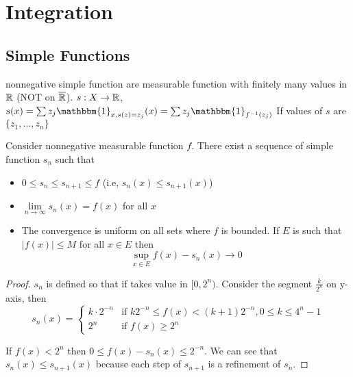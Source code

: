 
\chapter{Integration}
\section{Simple Functions}

\begin{definition}
  nonnegative simple function are measurable function with finitely many values in $\mathbb R$ (NOT on $\overline{\mathbb R}$).
  $s: X \to \mathbb R$, $s(x) = \sum z_j \mathbbm{1}_{x, s(z) = z_j}(x) = \sum z_j \mathbbm{1}_{f^{-1}({z_j})}$
  If values of $s$ are $\{z_1, \dotsc, z_n\}$
\end{definition}


\begin{theorem}
  Consider nonnegative measurable function $f$.
  There exist a sequence of simple function $s_n$ such that 
  \begin{itemize}
    \item $0 \le s_n \le s_{n+1} \le f$ (i.e, $s_n(x) \le s_{n+1}(x)$)
    \item $\lim\limits_{n\to\infty}s_n(x) = f(x)$ for all $x$
    \item The convergence is uniform on all sets where $f$ is bounded.
    If $E$ is such that $|f(x)| \le M$ for all $x \in E$ then
    \[\sup_{x \in E} f(x) - s_n(x) \to 0\]
  \end{itemize}
\end{theorem}

\begin{proof}
  $s_n$ is defined so that if takes value in $[0, 2^n)$. Consider the segment $\frac{k}{2^n}$ on y-axis,
  then $$s_n(x) = \begin{cases}
    k\cdot2^{-n} & \text{if } k2^{-n} \le f(x) < (k+1)2^{-n}, 0 \le k \le 4^n - 1 \\
    2^n & \text{if } f(x) \ge 2^n
  \end{cases}$$

If $f(x) < 2^n$ then $0 \le f(x) - s_n(x) \le 2^{-n}$. We can see that $s_n(x) \le s_{n+1}(x)$ because
each step of $s_{n+1}$ is a refinement of $s_n$.
\end{proof}


